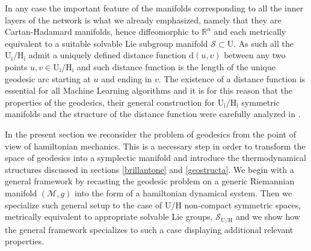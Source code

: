 \documentclass[10pt,a4paper]{article}
\begin{document}
In any case the important feature of the manifolds corresponding to all the inner layers of the network is what we already emphasized, namely that they are Cartan-Hadamard manifolds, hence diffeomorphic to $\mathbb{R}^n$ and each metrically equivalent to a suitable solvable Lie subgroup manifold $\mathcal{S} \subset \mathrm{U}$. As such all the $\mathrm{U_i/H_i}$ admit a uniquely defined distance function $\mathrm{d}(u,v)$ between any two points $u,v\in \mathrm{U_i/H_i}$ and such distance function is the length of the unique geodesic arc starting at $u$ and ending in $v$. The existence of a distance function is essential for all Machine Learning algorithms and it is for this reason that the properties of the geodesics, their general construction for $\mathrm{U_i/H_i}$ symmetric manifolds and the structure of the distance function were carefully analyzed in \cite{pgtstheory}.
\par
In the present section we reconsider the problem of geodesics from the point of view of hamiltonian mechanics. This is a necessary step in order to transform the space of geodesics into a symplectic manifold and introduce the thermodynamical structures discussed in sections \ref{brillantone} and
\ref{geostructa}. We begin with a general framework by recasting the geodesic problem on a generic Riemannian manifold $(\mathcal{M},g)$ into the form of a hamiltonian dynamical system. Then we specialize such general setup to the case of $\mathrm{U/H}$ non-compact symmetric spaces, metrically equivalent to appropriate solvable Lie groups, $\mathcal{S}_{\mathrm{U/H}}$ and we show how the general framework specializes to such a case displaying additional relevant properties.
\end{document}
